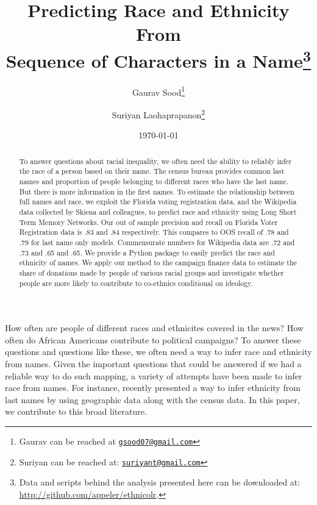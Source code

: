 \documentclass[12pt, letterpaper]{article}
\title{\Large{Predicting Race and Ethnicity From\\Sequence of Characters in a Name}\footnote{Data and scripts behind the analysis presented here can be downloaded at: \url{http://github.com/appeler/ethnicolr}.
}}
\author{Gaurav Sood\thanks{Gaurav can be reached at \href{mailto:gsood07@gmail.com}{\footnotesize{\texttt{gsood07@gmail.com}}}} \and Suriyan Laohaprapanon\thanks{Suriyan can be reached at: \href{mailto:suriyant@gmail.com}{\footnotesize{\texttt{suriyant@gmail.com}}}}\vspace{.5cm}}
\date{\vspace{.5cm}\normalsize{\today}}
\begin{document}
\maketitle

\begin{center}
\end{center}

\begin{comment}

setwd(paste0(githubdir, "ethnicolr_paper/"))
tools::texi2dvi("name_race.tex", pdf = TRUE, clean = TRUE) 
setwd(basedir)

\end{comment}


\begin{abstract}
To answer questions about racial inequality, we often need the ability to reliably infer the race of a person based on their name. The census bureau provides common last names and proportion of people belonging to different races who have the last name. But there is more information in the first names. To estimate the relationship between full names and race, we exploit the Florida voting registration data, and the Wikipedia data collected by Skiena and colleagues, to predict race and ethnicity using Long Short Term Memory Networks. Our out of sample precision and recall on Florida Voter Registration data is .83 and .84 respectively. This compares to OOS recall of .78 and .79 for last name only models. Commensurate numbers for Wikipedia data are .72 and .73 and .65 and .65. We provide a Python package to easily predict the race and ethnicity of names. We apply our method to the campaign finance data to estimate the share of donations made by people of various racial groups and investigate whether people are more likely to contribute to co-ethnics conditional on ideology.
\end{abstract}
\clearpage
\doublespace

How often are people of different races and ethnicites covered in the news? How often do African Americans contribute to political campaigns? To answer these questions and questions like these, we often need a way to infer race and ethnicity from names. Given the important questions that could be answered if we had a reliable way to do such mapping, a variety of attempts have been made to infer race from names. For instance, recently \citet{imai2016improving} presented a way to infer ethnicity from last names by using geographic data along with the census data. In this paper, we contribute to this broad literature. 
\end{document}
